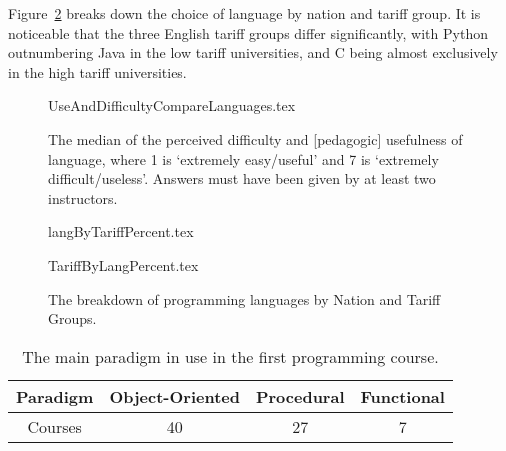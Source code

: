 \documentclass{sig-alternate}
\begin{document}
Figure~\ref{fig;LangTariff} breaks down the choice of language by
nation and tariff group.  It is noticeable that the three English
tariff groups differ significantly, with Python outnumbering Java in
the low tariff universities, and C being almost exclusively in the
high tariff universities.

\begin{figure}
\begin{center}
{UseAndDifficultyCompareLanguages.tex}
\end{center}\vskip-18pt
\caption{The median of the perceived difficulty and [pedagogic] usefulness of language, where 1 is `extremely easy/useful' and 7 is `extremely difficult/useless'.  Answers must have been given by at least two instructors.\label{fig:utility}}
\end{figure}

\begin{figure}
\begin{center}
{langByTariffPercent.tex}
\end{center}%
%
\begin{center}
{TariffByLangPercent.tex}
\end{center}\vskip-18pt
\caption{The breakdown of programming languages by Nation and Tariff Groups.\label{fig;LangTariff}}
\end{figure}

\begin{table}[]
\centering
\caption{The main paradigm in use in the first programming course.}
\label{tab:paradigm}
\begin{tabular}{cccc}
\hline
Paradigm & Object-Oriented & Procedural & Functional \\ \hline
Courses  & 40              & 27         & 7          \\ \hline
\end{tabular}
\end{table}

\end{document}
